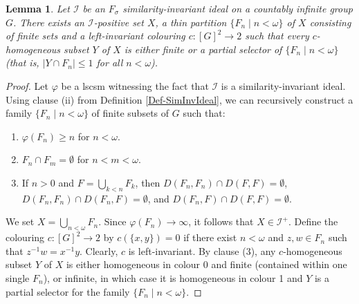 \documentclass{amsart}
\newtheorem{lemma}[theorem]{Lemma}
\theoremstyle{definition}
\theoremstyle{remark}
\numberwithin{equation}{section}
\begin{document}
\begin{lemma}\label{L: invariant-partition}
    Let $\mathcal{I}$ be an $F_{\sigma}$ similarity-invariant ideal on a countably infinite group $G$. There exists an $\mathcal{I}$-positive set $X$, a thin partition $\{F_{n} \mid  n < \omega\}$ of $X$ consisting of finite sets and a left-invariant colouring $c \colon [G]^{2} \longrightarrow 2$ such that every $c$-homogeneous subset $Y$ of $X$ is either finite or a partial selector of $\{F_{n} \mid  n < \omega\}$ (that is, $|Y \cap F_{n}| \leq 1$ for all $n < \omega$). 
\end{lemma}




\begin{proof}
    Let $\varphi$ be a lscsm witnessing the fact that $\mathcal{I}$ is a similarity-invariant ideal. Using clause (ii) from Definition \ref{Def-SimInvIdeal}, we can recursively construct a family $\{F_{n} \mid  n < \omega \}$ of finite subsets of $G$ such that:
    \begin{enumerate}
        \item $\varphi(F_{n}) \geq n$ for $n <   \omega$.
        \item $F_{n} \cap F_{m} = \emptyset$ for $n<m<\omega$.
        \item If $n > 0$ and $F=\bigcup_{k<n}F_{k}$, then $D(F_{n},F_{n}) \cap D(F, F) = \emptyset$, $D(F_{n},F_{n}) \cap D(F_{n},F) = \emptyset$, and $D(F_{n}, F) \cap D(F, F) = \emptyset$.
    \end{enumerate}
    
    We set $X = \bigcup_{n < \omega} F_{n}$. Since $\varphi(F_{n}) \to \infty$, it follows that $X \in \mathcal{I}^{+}$. Define the colouring $c \colon [G]^{2} \longrightarrow 2$ by $c(\{x,y\})=0$ if there exist $n < \omega$ and $z,w \in F_{n}$ such that $z^{-1}w = x^{-1}y$. Clearly, $c$ is left-invariant. By clause (3), any $c$-homogeneous subset $Y$ of $X$ is either homogeneous in colour 0 and finite (contained within one single $F_{n}$), or infinite, in which case it is homogeneous in colour 1 and $Y$ is a partial selector for the family $\{F_{n} \mid  n < \omega \}$.
\end{proof}
\end{document}
